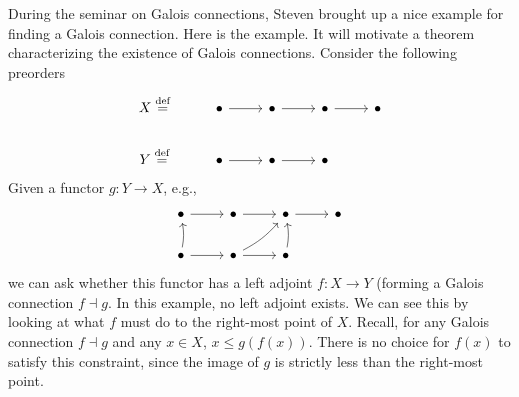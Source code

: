 \documentclass[../main.tex]{subfiles}
\begin{document}
\begin{example}
  During the seminar on Galois connections, Steven brought up a nice example
  for finding a Galois connection. Here is the example. It will motivate a
  theorem characterizing the existence of Galois connections. Consider the
  following preorders
  \[%
    \begin{tikzcd}
      X \eqdef & \bullet \arrow[r] & \bullet \arrow[r] & \bullet \arrow[r] & \bullet\\
      Y \eqdef & \bullet \arrow[r] & \bullet \arrow[r] & \bullet
    \end{tikzcd}
  \]%
  Given a functor \(g : Y \to X\), e.g.,
  \[%
    \begin{tikzcd}
      \bullet \arrow[r] & \bullet \arrow[r] & \bullet \arrow[r] & \bullet\\
      \bullet \arrow[u,bend right=10] \arrow[r] & \bullet \arrow[ur, bend
      right=10] \arrow[r] & \bullet
      \arrow[u, bend right=10]
    \end{tikzcd}
  \]%
  we can ask whether this functor has a left adjoint \(f: X \to Y\) (forming a
  Galois connection \(f \dashv g\). In this example, no left adjoint exists. We
  can see this by looking at what \(f\) must do to the right-most point of
  \(X\). Recall, for any Galois connection \(f \dashv g\) and any \(x \in X\),
  \(x \leq g(f(x))\). There is no choice for \(f(x)\) to satisfy this
  constraint, since the image of \(g\) is strictly less than the right-most
  point.


\end{example}
\end{document}
